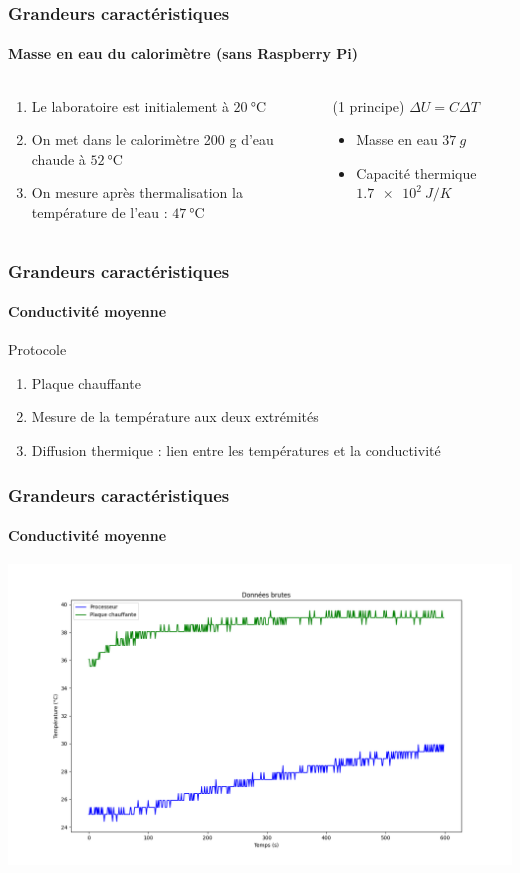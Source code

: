 \documentclass[a4paper,11pt]{beamer}
\newcommand{\cel}{\degreeCelsius}
\begin{document}
\begin{frame}
    \frametitle{Grandeurs caractéristiques}
    \framesubtitle{Masse en eau du calorimètre (sans Raspberry Pi)}

    \begin{columns}
        \begin{column}{0.5\textwidth}
            \begin{enumerate}
                \item Le laboratoire est initialement à $\SI{20}{\cel}$
                \item On met dans le calorimètre 200 g d'eau chaude à $\SI{52}{\cel}$
                \item On mesure après thermalisation la température de l'eau : $\SI{47}{\cel}$
            \end{enumerate}
        \end{column}
        \vrule{}
        \begin{column}{0.5\textwidth}
            (1\ier{} principe) $\Delta U = C \Delta T$
            \begin{itemize}
                \item Masse en eau $\SI{37}{g}$
                \item Capacité thermique $\SI{1,7e2}{J/K}$
            \end{itemize}
        \end{column}
    \end{columns}
\end{frame}

\begin{frame}
    \frametitle{Grandeurs caractéristiques}
    \framesubtitle{Conductivité moyenne}

    Protocole
    \begin{enumerate}
        \item Plaque chauffante
        \item Mesure de la température aux deux extrémités
        \item Diffusion thermique : lien entre les températures et la conductivité
    \end{enumerate}
\end{frame}

\begin{frame}
    \frametitle{Grandeurs caractéristiques}
    \framesubtitle{Conductivité moyenne}

    \includegraphics[width=\textwidth]{donnees_brutes.png}
\end{frame}
\end{document}
